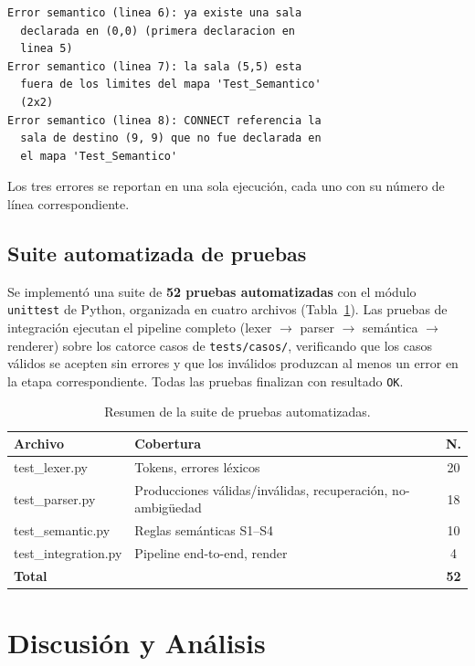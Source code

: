\documentclass[10pt,twocolumn]{article}
\begin{document}
\begin{lstlisting}[caption={Salida real del sistema ante errores semánticos.}]
Error semantico (linea 6): ya existe una sala
  declarada en (0,0) (primera declaracion en
  linea 5)
Error semantico (linea 7): la sala (5,5) esta
  fuera de los limites del mapa 'Test_Semantico'
  (2x2)
Error semantico (linea 8): CONNECT referencia la
  sala de destino (9, 9) que no fue declarada en
  el mapa 'Test_Semantico'
\end{lstlisting}

Los tres errores se reportan en una sola ejecución, cada uno con su número
de línea correspondiente.

\subsection{Suite automatizada de pruebas}

Se implementó una suite de \textbf{52 pruebas automatizadas} con el módulo
\texttt{unittest} de Python, organizada en cuatro archivos
(Tabla~\ref{tab:tests}). Las pruebas de integración ejecutan el pipeline
completo (lexer $\to$ parser $\to$ semántica $\to$ renderer) sobre los
catorce casos de \texttt{tests/casos/}, verificando que los casos válidos
se acepten sin errores y que los inválidos produzcan al menos un error en
la etapa correspondiente. Todas las pruebas finalizan con resultado
\texttt{OK}.

\begin{table}[t]
\centering
\caption{Resumen de la suite de pruebas automatizadas.}
\label{tab:tests}
\scriptsize
\begin{tabularx}{\linewidth}{l X c}
\toprule
\textbf{Archivo} & \textbf{Cobertura} & \textbf{N.} \\
\midrule
test\_lexer.py        & Tokens, errores léxicos               & 20 \\
test\_parser.py        & Producciones válidas/inválidas, recuperación, no-ambigüedad & 18 \\
test\_semantic.py        & Reglas semánticas S1--S4    & 10 \\
test\_integration.py       & Pipeline end-to-end, render & 4 \\
\midrule
\textbf{Total}                & & \textbf{52} \\
\bottomrule
\end{tabularx}
\end{table}

\section{Discusión y Análisis}
\end{document}
